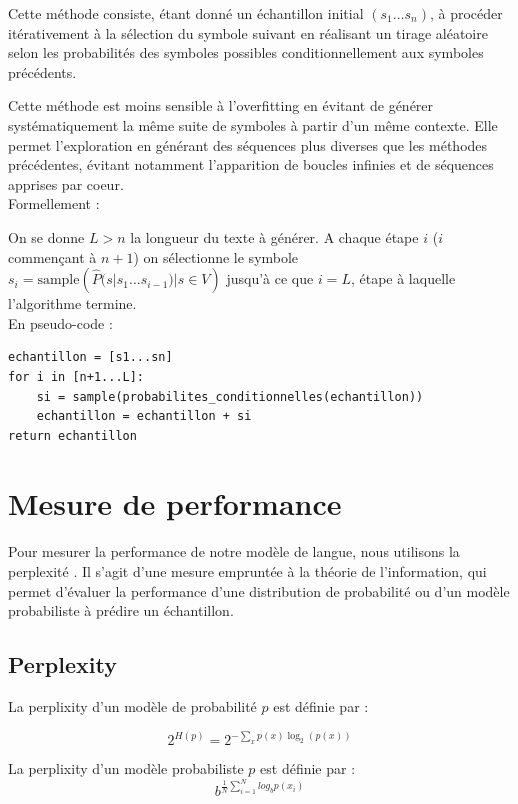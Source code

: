 Cette méthode consiste, étant donné un échantillon initial $(s_1\ldots s_n)$, à procéder itérativement à la sélection du symbole suivant en réalisant un tirage aléatoire selon les probabilités des symboles possibles conditionnellement aux symboles précédents.

Cette méthode est moins sensible à l'overfitting en évitant de générer systématiquement la même suite de symboles à partir d'un même contexte. Elle permet l'exploration en générant des séquences plus diverses que les méthodes précédentes, évitant notamment l'apparition de boucles infinies et de séquences apprises par coeur. \\

Formellement :

On se donne $L>n$ la longueur du texte à générer.
A chaque étape $i$ ($i$ commençant à $n+1$) on sélectionne le symbole $s_i = \text{sample}({\widehat{P}(s|s_1\ldots s_{i-1}) | s \in V})$ jusqu'à ce que $i=L$, étape à laquelle l'algorithme termine. \\

En pseudo-code :

\begin{verbatim}
echantillon = [s1...sn]
for i in [n+1...L]:
    si = sample(probabilites_conditionnelles(echantillon))
    echantillon = echantillon + si
return echantillon
\end{verbatim}

\section{Mesure de performance}

Pour mesurer la performance de notre modèle de langue, nous utilisons la \og perplexité \fg{}. Il s'agit d'une mesure empruntée à la théorie de l'information, qui permet d'évaluer la performance d'une distribution de probabilité ou d'un modèle probabiliste à prédire un échantillon.

\subsection{Perplexity}

\begin{definition}
La perplixity d'un modèle de probabilité $p$ est définie par :

  \[ 2^{H(p)} = 2^{- \sum_{x}^{} p(x) \log_2(p(x))} \]
\end{definition}

\begin{definition}
La perplixity d'un modèle probabiliste $p$ est définie par :
  \[ b^{ \frac{1}{N} \sum_{i=1}^{N}  log_b p(x_i)} \]
\end{definition}

